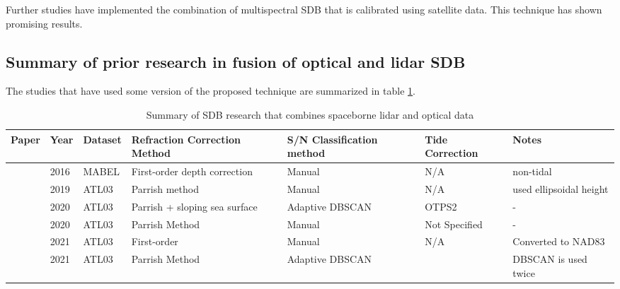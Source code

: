 Further studies have implemented the combination of multispectral SDB that is calibrated using satellite data. This technique has shown promising results.

\subsection{Summary of prior research in fusion of optical and lidar SDB}

The studies that have used some version of the proposed technique are summarized in table \ref{researchsummary}.

\begin{landscape}
      \begin{table}
            \label{researchsummary}
            \caption{Summary of SDB research that combines spaceborne lidar and optical data}
            \begin{tabular}{p{3.7cm}llp{3.2cm}p{3.5cm}ll}
                  \midrule
                  Paper                             & Year & Dataset & Refraction Correction Method  & S/N Classification method      & Tide Correction & Notes                        \\
                  \hline
                  \citeauthor{Forfinski-Sarkozi2016} & 2016 & MABEL   & First-order depth correction  & Manual                         & N/A             & non-tidal                    \\
                  \citeauthor{Parrish2019}           & 2019 & ATL03   & Parrish method                & Manual                         & N/A             & used  ellipsoidal height     \\
                  \citeauthor{Ma2020}                & 2020 & ATL03   & Parrish + sloping sea surface & Adaptive DBSCAN                & OTPS2           & -                            \\
                  \citeauthor{Thomas2021d}           & 2020 & ATL03   & Parrish Method                & Manual                         & Not Specified   & -                            \\
                  \citeauthor{Albright2021}          & 2021 & ATL03   & First-order                   & Manual                         & N/A             & Converted to NAD83           \\
                  \citeauthor{Xie2021}               & 2021 & ATL03   & Parrish Method                & Adaptive DBSCAN                &                 & DBSCAN  is used twice        \\

\end{tabular}
\end{table}
\end{landscape}
